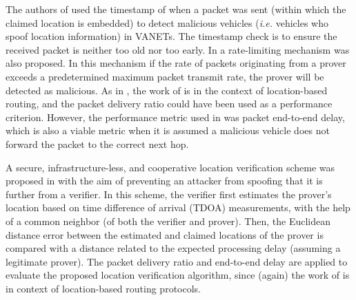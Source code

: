 \documentclass[journal]{IEEEtran}
\begin{document}
The authors of \cite{harsch2007secure} used the timestamp of when a packet was sent (within which the claimed location is embedded) to detect malicious vehicles (\emph{i.e.} vehicles who spoof location information) in VANETs. The timestamp check is to ensure the received packet is neither too old nor too early. In \cite{harsch2007secure}  a rate-limiting mechanism was also proposed. In this mechanism if the rate of packets originating from a prover exceeds a predetermined maximum packet transmit rate, the prover will be detected as malicious.  As in \cite{leinmuller2006position}, the work of \cite{harsch2007secure} is in the context of location-based routing, and  the packet delivery ratio could have been used as a performance criterion. However, the performance metric used in  \cite{leinmuller2006position} was packet end-to-end delay, which is also a viable metric when it is assumed a malicious vehicle does not forward the packet to the correct next hop.





A secure, infrastructure-less, and cooperative location verification scheme was proposed in \cite{song2008secure} with the aim of preventing an attacker from spoofing that it is further from a verifier. In this scheme, the verifier first estimates the prover's location based on time difference of arrival (TDOA) measurements, with the help of a common neighbor (of both the verifier and prover). Then, the Euclidean  distance error between the estimated and claimed locations of the prover is compared with a distance related to the expected processing delay (assuming a legitimate prover). The packet delivery ratio and  end-to-end delay are applied to evaluate the proposed location verification algorithm, since (again) the work of \cite{song2008secure} is in context of location-based routing protocols.
\end{document}
